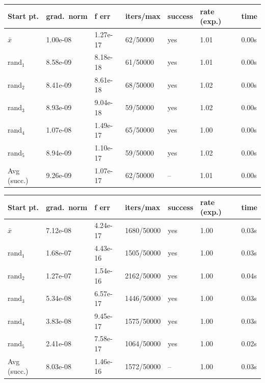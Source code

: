 


\begin{tabular}{lllllll}
\toprule
Start pt. & grad.\ norm & f err & iters/max & success & rate (exp.) & time \\
\midrule
\(\bar{x}\) & 1.00e-08 & 1.27e-17 & 62/50000 & yes & 1.01 & 0.00s \\
rand$_{1}$ & 8.58e-09 & 8.18e-18 & 61/50000 & yes & 1.01 & 0.00s \\
rand$_{2}$ & 8.41e-09 & 8.61e-18 & 68/50000 & yes & 1.02 & 0.00s \\
rand$_{3}$ & 8.93e-09 & 9.04e-18 & 59/50000 & yes & 1.02 & 0.00s \\
rand$_{4}$ & 1.07e-08 & 1.49e-17 & 65/50000 & yes & 1.00 & 0.00s \\
rand$_{5}$ & 8.94e-09 & 1.10e-17 & 59/50000 & yes & 1.02 & 0.00s \\
\midrule
Avg (succ.) & 9.26e-09 & 1.07e-17 & 62/50000 & -- & 1.01 & 0.00s \\
\bottomrule
\end{tabular}

\begin{tabular}{lllllll}
\toprule
Start pt. & grad.\ norm & f err & iters/max & success & rate (exp.) & time \\
\midrule
\(\bar{x}\) & 7.12e-08 & 4.24e-17 & 1680/50000 & yes & 1.00 & 0.03s \\
rand$_{1}$ & 1.68e-07 & 4.43e-16 & 1505/50000 & yes & 1.00 & 0.03s \\
rand$_{2}$ & 1.27e-07 & 1.54e-16 & 2162/50000 & yes & 1.00 & 0.04s \\
rand$_{3}$ & 5.34e-08 & 6.57e-17 & 1446/50000 & yes & 1.00 & 0.03s \\
rand$_{4}$ & 3.83e-08 & 9.45e-17 & 1575/50000 & yes & 1.00 & 0.03s \\
rand$_{5}$ & 2.41e-08 & 7.58e-17 & 1064/50000 & yes & 1.00 & 0.02s \\
\midrule
Avg (succ.) & 8.03e-08 & 1.46e-16 & 1572/50000 & -- & 1.00 & 0.03s \\
\bottomrule
\end{tabular}

